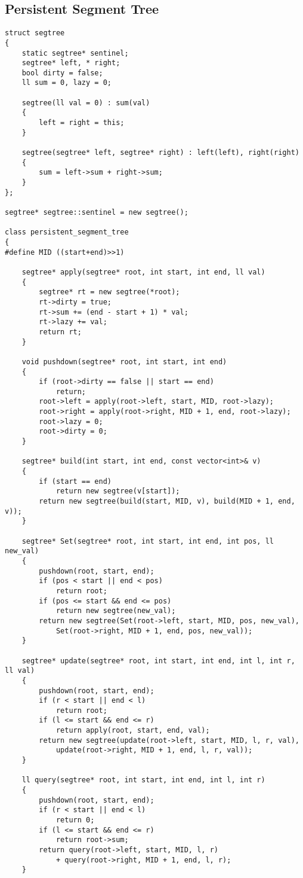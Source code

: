 \documentclass{article}
\begin{document}
\subsection{Persistent Segment Tree}
\begin{verbatim}
struct segtree
{
	static segtree* sentinel;
	segtree* left, * right;
	bool dirty = false;
	ll sum = 0, lazy = 0;

	segtree(ll val = 0) : sum(val)
	{
		left = right = this;
	}

	segtree(segtree* left, segtree* right) : left(left), right(right)
	{
		sum = left->sum + right->sum;
	}
};

segtree* segtree::sentinel = new segtree();

class persistent_segment_tree
{
#define MID ((start+end)>>1)

	segtree* apply(segtree* root, int start, int end, ll val)
	{
		segtree* rt = new segtree(*root);
		rt->dirty = true;
		rt->sum += (end - start + 1) * val;
		rt->lazy += val;
		return rt;
	}

	void pushdown(segtree* root, int start, int end)
	{
		if (root->dirty == false || start == end)
			return;
		root->left = apply(root->left, start, MID, root->lazy);
		root->right = apply(root->right, MID + 1, end, root->lazy);
		root->lazy = 0;
		root->dirty = 0;
	}

	segtree* build(int start, int end, const vector<int>& v)
	{
		if (start == end)
			return new segtree(v[start]);
		return new segtree(build(start, MID, v), build(MID + 1, end, v));
	}

	segtree* Set(segtree* root, int start, int end, int pos, ll new_val)
	{
		pushdown(root, start, end);
		if (pos < start || end < pos)
			return root;
		if (pos <= start && end <= pos)
			return new segtree(new_val);
		return new segtree(Set(root->left, start, MID, pos, new_val),
			Set(root->right, MID + 1, end, pos, new_val));
	}

	segtree* update(segtree* root, int start, int end, int l, int r, ll val)
	{
		pushdown(root, start, end);
		if (r < start || end < l)
			return root;
		if (l <= start && end <= r)
			return apply(root, start, end, val);
		return new segtree(update(root->left, start, MID, l, r, val),
			update(root->right, MID + 1, end, l, r, val));
	}

	ll query(segtree* root, int start, int end, int l, int r)
	{
		pushdown(root, start, end);
		if (r < start || end < l)
			return 0;
		if (l <= start && end <= r)
			return root->sum;
		return query(root->left, start, MID, l, r)
			+ query(root->right, MID + 1, end, l, r);
	}


\end{verbatim}
\end{document}
